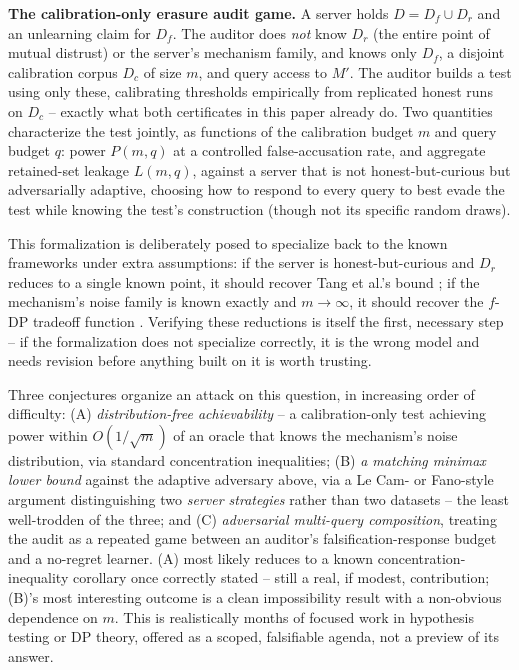 \documentclass[10pt,journal,compsoc]{IEEEtran}
\begin{document}
\textbf{The calibration-only erasure audit game.} A server holds $D=D_f\cup D_r$ and an unlearning claim for $D_f$. The auditor does \emph{not} know $D_r$ (the entire point of mutual distrust) or the server's mechanism family, and knows only $D_f$, a disjoint calibration corpus $D_c$ of size $m$, and query access to $M'$. The auditor builds a test using only these, calibrating thresholds empirically from replicated honest runs on $D_c$ -- exactly what both certificates in this paper already do. Two quantities characterize the test jointly, as functions of the calibration budget $m$ and query budget $q$: power $P(m,q)$ at a controlled false-accusation rate, and aggregate retained-set leakage $L(m,q)$, against a server that is not honest-but-curious but adversarially adaptive, choosing how to respond to every query to best evade the test while knowing the test's construction (though not its specific random draws).

This formalization is deliberately posed to specialize back to the known frameworks under extra assumptions: if the server is honest-but-curious and $D_r$ reduces to a single known point, it should recover Tang et al.'s bound \cite{tang2026geometric}; if the mechanism's noise family is known exactly and $m\to\infty$, it should recover the $f$-DP tradeoff function \cite{dong2022gdp}. Verifying these reductions is itself the first, necessary step -- if the formalization does not specialize correctly, it is the wrong model and needs revision before anything built on it is worth trusting.

Three conjectures organize an attack on this question, in increasing order of difficulty: (A) \emph{distribution-free achievability} -- a calibration-only test achieving power within $O(1/\sqrt m)$ of an oracle that knows the mechanism's noise distribution, via standard concentration inequalities; (B) \emph{a matching minimax lower bound} against the adaptive adversary above, via a Le Cam- or Fano-style argument distinguishing two \emph{server strategies} rather than two datasets -- the least well-trodden of the three; and (C) \emph{adversarial multi-query composition}, treating the audit as a repeated game between an auditor's falsification-response budget and a no-regret learner. (A) most likely reduces to a known concentration-inequality corollary once correctly stated -- still a real, if modest, contribution; (B)'s most interesting outcome is a clean impossibility result with a non-obvious dependence on $m$. This is realistically months of focused work in hypothesis testing or DP theory, offered as a scoped, falsifiable agenda, not a preview of its answer.
\end{document}

